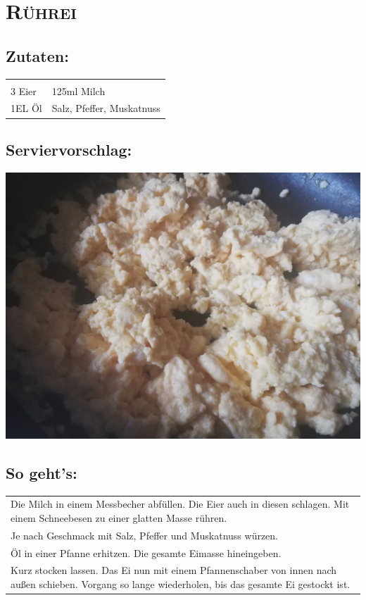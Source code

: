 \section{\textsc{Rührei}}

\subsection*{Zutaten:}

\begin{tabular}{p{7.5cm} p{7.5cm}}
	& \\
	3 Eier & 125ml Milch \\
	1EL Öl & Salz, Pfeffer, Muskatnuss
\end{tabular}

\subsection*{Serviervorschlag:}

\includegraphics[width=\textwidth]{img/ruehrei/ruehrei_fertig.jpg} \cite{ruehrei}

\subsection*{So geht's:}

\begin{tabular}{p{15cm}}
	\\
	Die Milch in einem Messbecher abfüllen. Die Eier auch in diesen schlagen. Mit einem Schneebesen zu einer glatten Masse rühren.\\
	Je nach Geschmack mit Salz, Pfeffer und Muskatnuss würzen.\\
	Öl in einer Pfanne erhitzen. Die gesamte Eimasse hineingeben.\\
	Kurz stocken lassen. Das Ei nun mit einem Pfannenschaber von innen nach außen schieben. Vorgang so lange wiederholen, bis das gesamte Ei gestockt ist.
\end{tabular}